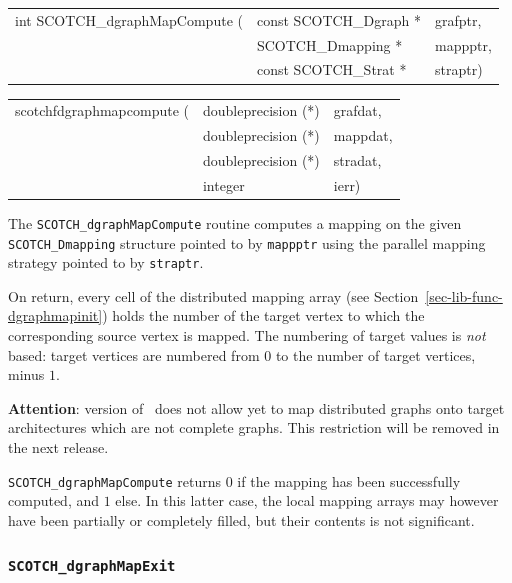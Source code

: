 \begin{itemize}
\progsyn

{\tt\begin{tabular}{l@{}ll}
int SCOTCH\_dgraphMapCompute ( & const SCOTCH\_Dgraph * & grafptr, \\
                               & SCOTCH\_Dmapping *     & mappptr, \\
                               & const SCOTCH\_Strat *  & straptr)
\end{tabular}}

{\tt\begin{tabular}{l@{}ll}
scotchfdgraphmapcompute ( & doubleprecision (*) & grafdat, \\
                          & doubleprecision (*) & mappdat, \\
                          & doubleprecision (*) & stradat, \\
                          & integer             & ierr)
\end{tabular}}

\progdes

The {\tt SCOTCH\_dgraphMapCompute} routine computes a mapping
on the given {\tt SCOTCH\_\lbt Dmapping} structure pointed
to by {\tt mappptr} using the parallel mapping strategy pointed to
by {\tt straptr}.

On return, every cell of the distributed mapping array (see
Section~\ref{sec-lib-func-dgraphmapinit}) holds the number of the target
vertex to which the corresponding source vertex is mapped. The
numbering of target values is {\em not\/} based: target vertices are
numbered from $0$ to the number of target vertices, minus $1$.

{\bf Attention}: version {} of \scotch\ does not allow yet to
map distributed graphs onto target architectures which are not
complete graphs. This restriction will be removed in the next release.

\progret

{\tt SCOTCH\_dgraphMapCompute} returns $0$ if the mapping has been
successfully computed, and $1$ else. In this latter case, the local
mapping arrays may however have been partially or completely filled,
but their contents is not significant.
\end{itemize}

\subsubsection{{\tt SCOTCH\_dgraphMapExit}}

